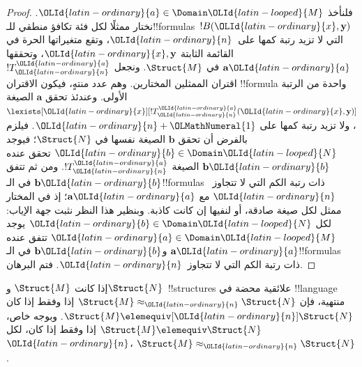 \documentclass[../../../include/open-logic-section]{subfiles}
\begin{document}
\begin{proof}
  فلنأخذ $\OLId{latin-ordinary}{a} \in \Domain \OLId{latin-looped}{M}$. نختار ممثلًا لكل فئة تكافؤ منطقي
  للـ!!{formula}s~$!B(\OLId{latin-ordinary}{x},\mathbf{y})$ التي لا تزيد رتبة كمها على~$\OLId{latin-ordinary}{n}$،
  وتقع متغيراتها الحرة في القائمة الثابتة $\OLId{latin-ordinary}{x},\mathbf{y}$،
  وتحققها $\mathbf{a}\OLId{latin-ordinary}{a}$ في $\Struct{M}$. ونجعل $!T^\OLId{latin-ordinary}{a}_\OLId{latin-ordinary}{n}$
  اقتران الممثلين المختارين. وهم عدد منتهٍ، فيكون الاقتران
  !!{formula} واحدة من الرتبة الأولى. وعندئذ تحقق $\mathbf{a}$
  الصيغة $\lexists[\OLId{latin-ordinary}{x}][!T^\OLId{latin-ordinary}{a}_\OLId{latin-ordinary}{n}(\OLId{latin-ordinary}{x},\mathbf{y})]$، ولا تزيد رتبة
  كمها على $\OLId{latin-ordinary}{n}+\OLMathNumeral{1}$. فيلزم بالفرض أن تحقق $\mathbf{b}$ الصيغة
  نفسها في $\Struct{N}$؛ فيوجد $\OLId{latin-ordinary}{b} \in \Domain \OLId{latin-looped}{N}$ تحقق عنده
  $\mathbf{b}\OLId{latin-ordinary}{b}$ الصيغة $!T^\OLId{latin-ordinary}{a}_\OLId{latin-ordinary}{n}$. ومن ثم تتفق $\mathbf{b}\OLId{latin-ordinary}{b}$
  في الـ!!{formula}s ذات رتبة الكم التي لا تتجاوز~$\OLId{latin-ordinary}{n}$
  مع $\mathbf{a}\OLId{latin-ordinary}{a}$؛ إذ في المختار ممثل لكل صيغة صادقة،
  أو لنفيها إن كانت كاذبة. وبنظير هذا النظر نثبت جهة الإياب:
  لكل $\OLId{latin-ordinary}{b} \in \Domain \OLId{latin-looped}{N}$ يوجد $\OLId{latin-ordinary}{a}\in \Domain \OLId{latin-looped}{M}$ تتفق عنده
  $\mathbf{a}\OLId{latin-ordinary}{a}$ و$\mathbf{b}\OLId{latin-ordinary}{b}$ في الـ!!{formula}s ذات رتبة
  الكم التي لا تتجاوز~$\OLId{latin-ordinary}{n}$. فتم البرهان.
\end{proof}

\begin{cor}
  إذا كانت $\Struct{M}$ و$\Struct{N}$~!!{structure}s علائقية محضة في
  !!{language} منتهية، فإن $\Struct{M} \approx_\OLId{latin-ordinary}{n}\Struct{N}$ إذا وفقط
  إذا كان $\Struct{M} \elemequiv[\OLId{latin-ordinary}{n}] \Struct{N}$. وبوجه خاص،
  $\Struct{M} \elemequiv \Struct{N}$ إذا وفقط إذا كان، لكل $\OLId{latin-ordinary}{n}$،
  $\Struct{M} \approx_\OLId{latin-ordinary}{n} \Struct{N}$.
\end{cor}
\end{document}
